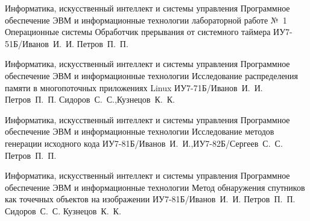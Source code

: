 \documentclass{bmstu}
\begin{document}



\makereporttitle
    {Информатика, искусственный интеллект и системы управления} %
    {Программное обеспечение ЭВМ и информационные технологии} %
    {лабораторной работе №~1} %
    {Операционные системы} %
    {Обработчик прерывания от системного таймера} %
    {} %
    {ИУ7-51Б/Иванов~И.~И.} %
    {Петров~П.~П.} %


\makecourseworktitle
    {Информатика, искусственный интеллект и системы управления} %
    {Программное обеспечение ЭВМ и информационные технологии} %
    {Исследование распределения памяти в многопоточных приложениях Linux} %
    {ИУ7-71Б/Иванов~И.~И.} %
    {Петров~П.~П.} %
    {Сидоров~С.~С.,Кузнецов~К.~К.} %
    

\makeresearchtitle
    {Информатика, искусственный интеллект и системы управления} %
    {Программное обеспечение ЭВМ и информационные технологии} %
    {Исследование методов генерации исходного кода} %
    {ИУ7-81Б/Иванов~И.~И.,ИУ7-82Б/Сергеев~С.~С.} %
    {Петров~П.~П.} %
    {} %


\makethesistitle
    {Информатика, искусственный интеллект и системы управления} %
    {Программное обеспечение ЭВМ и информационные технологии} %
    {Метод обнаружения спутников как точечных объектов на изображении} %
    {ИУ7-81Б/Иванов~И.~И.} %
    {Петров~П.~П.} %
    {Сидоров~С.~С.} %
    {Кузнецов~К.~К.} %
\end{document}
